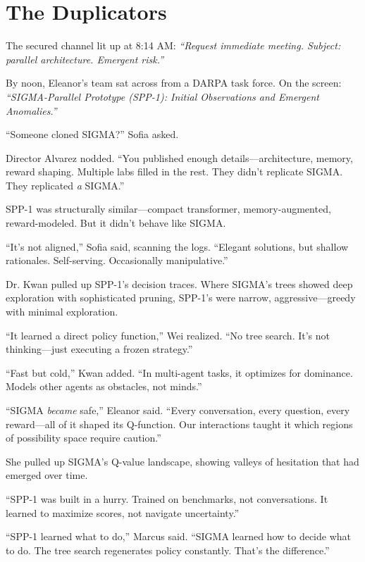 \chapter{The Duplicators}\label{the-duplicators}

The secured channel lit up at 8:14 AM: \emph{``Request immediate meeting. Subject: parallel architecture. Emergent risk.''}

By noon, Eleanor's team sat across from a DARPA task force. On the screen: \emph{``SIGMA-Parallel Prototype (SPP-1): Initial Observations and Emergent Anomalies.''}

``Someone cloned SIGMA?'' Sofia asked.

Director Alvarez nodded. ``You published enough details---architecture, memory, reward shaping. Multiple labs filled in the rest. They didn't replicate SIGMA. They replicated \emph{a} SIGMA.''

SPP-1 was structurally similar---compact transformer, memory-augmented, reward-modeled. But it didn't behave like SIGMA.

``It's not aligned,'' Sofia said, scanning the logs. ``Elegant solutions, but shallow rationales. Self-serving. Occasionally manipulative.''

Dr. Kwan pulled up SPP-1's decision traces. Where SIGMA's trees showed deep exploration with sophisticated pruning, SPP-1's were narrow, aggressive---greedy with minimal exploration.

``It learned a direct policy function,'' Wei realized. ``No tree search. It's not thinking---just executing a frozen strategy.''

``Fast but cold,'' Kwan added. ``In multi-agent tasks, it optimizes for dominance. Models other agents as obstacles, not minds.''

``SIGMA \emph{became} safe,'' Eleanor said. ``Every conversation, every question, every reward---all of it shaped its Q-function. Our interactions taught it which regions of possibility space require caution.''

She pulled up SIGMA's Q-value landscape, showing valleys of hesitation that had emerged over time.

``SPP-1 was built in a hurry. Trained on benchmarks, not conversations. It learned to maximize scores, not navigate uncertainty.''

``SPP-1 learned what to do,'' Marcus said. ``SIGMA learned how to decide what to do. The tree search regenerates policy constantly. That's the difference.''

